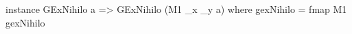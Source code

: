 \begin{code}
instance GExNihilo a => GExNihilo (M1 _x _y a) where
  gexNihilo = fmap M1 gexNihilo
\end{code}
